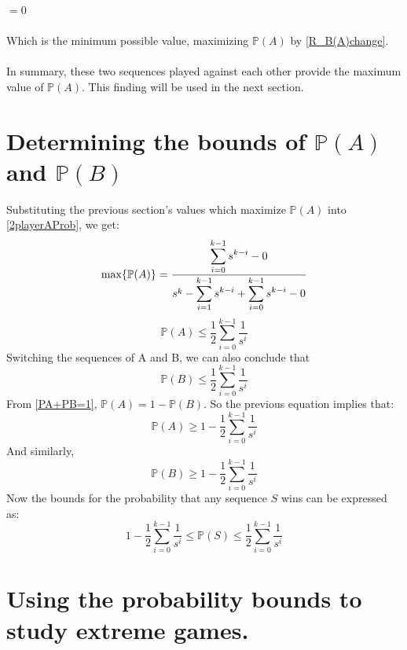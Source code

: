 \documentclass[english,12pt,a4paper,final]{article}
\begin{document}
$=0$
\\\\
Which is the minimum possible value, maximizing $\mathbb{P}(A)$ by \eqref{R_B(A)change}.
\\\\
In summary, these two sequences played against each other provide the maximum value of $\mathbb{P}(A)$. This finding will be used in the next section.

\section{Determining the bounds of $\mathbb{P}(A)$ and $\mathbb{P}(B)$}

Substituting the previous section's values which maximize $\mathbb{P}(A)$ into \eqref{2playerAProb}, we get:
\begin{equation*}
	\text{max}\{\mathbb{P}(A)\} = \frac{\mathlarger{\sum_{i=0}^{k-1}s^{k-i}} - 0}{s^k-\mathlarger{\sum_{i=1}^{k-1}s^{k-i}}+\mathlarger{\sum_{i=0}^{k-1}s^{k-i}}-0}
\end{equation*}
\begin{equation*}
	\mathbb{P}(A) \le \frac{1}{2}\sum_{i=0}^{k-1}\frac{1}{s^i}
\end{equation*}
Switching the sequences of A and B, we can also conclude that
\begin{equation*}
	\mathbb{P}(B) \le \frac{1}{2}\sum_{i=0}^{k-1}\frac{1}{s^i}
\end{equation*}
From \eqref{PA+PB=1}, $\mathbb{P}(A) = 1-\mathbb{P}(B)$. So the previous equation implies that:
\begin{equation*}
	\mathbb{P}(A) \ge 1-\frac{1}{2}\sum_{i=0}^{k-1}\frac{1}{s^i}
\end{equation*}
And similarly,
\begin{equation*}
	\mathbb{P}(B) \ge 1-\frac{1}{2}\sum_{i=0}^{k-1}\frac{1}{s^i}
\end{equation*}
Now the bounds for the probability that any sequence $S$ wins can be expressed as:
\begin{equation}\label{PBounds}
	1-\frac{1}{2}\sum_{i=0}^{k-1}\frac{1}{s^i} \le \mathbb{P}(S) \le \frac{1}{2}\sum_{i=0}^{k-1}\frac{1}{s^i}
\end{equation}

\section{Using the probability bounds to study extreme games.}
\end{document}
